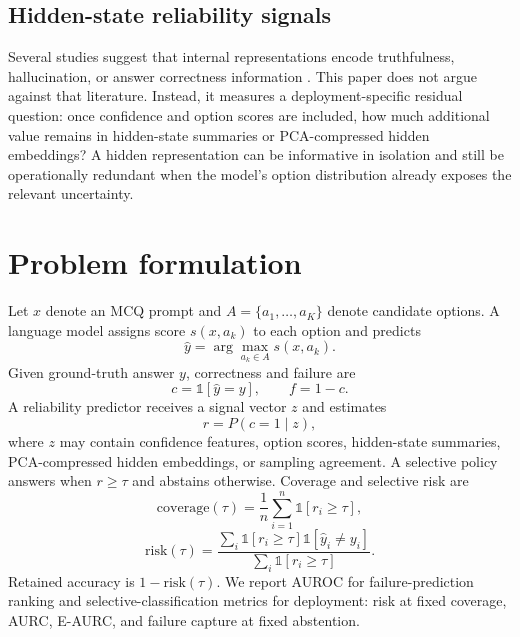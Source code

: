 \documentclass[preprint,12pt,authoryear]{elsarticle}
\begin{document}
\subsection{Hidden-state reliability signals}
Several studies suggest that internal representations encode truthfulness, hallucination, or answer correctness information \citep{chen2024inside,orgad2024llms,ji2024internal}. This paper does not argue against that literature. Instead, it measures a deployment-specific residual question: once confidence and option scores are included, how much additional value remains in hidden-state summaries or PCA-compressed hidden embeddings? A hidden representation can be informative in isolation and still be operationally redundant when the model's option distribution already exposes the relevant uncertainty.

\section{Problem formulation}
Let $x$ denote an MCQ prompt and $A=\{a_1,\ldots,a_K\}$ denote candidate options. A language model assigns score $s(x,a_k)$ to each option and predicts
\begin{equation}
\hat{y}=\arg\max_{a_k\in A} s(x,a_k).
\end{equation}
Given ground-truth answer $y$, correctness and failure are
\begin{equation}
c=\mathbb{1}[\hat{y}=y], \qquad f=1-c.
\end{equation}
A reliability predictor receives a signal vector $z$ and estimates
\begin{equation}
r=P(c=1\mid z),
\end{equation}
where $z$ may contain confidence features, option scores, hidden-state summaries, PCA-compressed hidden embeddings, or sampling agreement. A selective policy answers when $r\geq\tau$ and abstains otherwise. Coverage and selective risk are
\begin{equation}
\mathrm{coverage}(\tau)=\frac{1}{n}\sum_{i=1}^{n}\mathbb{1}[r_i\geq\tau],
\end{equation}
\begin{equation}
\mathrm{risk}(\tau)=\frac{\sum_i \mathbb{1}[r_i\geq\tau]\mathbb{1}[\hat{y}_i\neq y_i]}{\sum_i \mathbb{1}[r_i\geq\tau]}.
\end{equation}
Retained accuracy is $1-\mathrm{risk}(\tau)$. We report AUROC for failure-prediction ranking and selective-classification metrics for deployment: risk at fixed coverage, AURC, E-AURC, and failure capture at fixed abstention.
\end{document}
